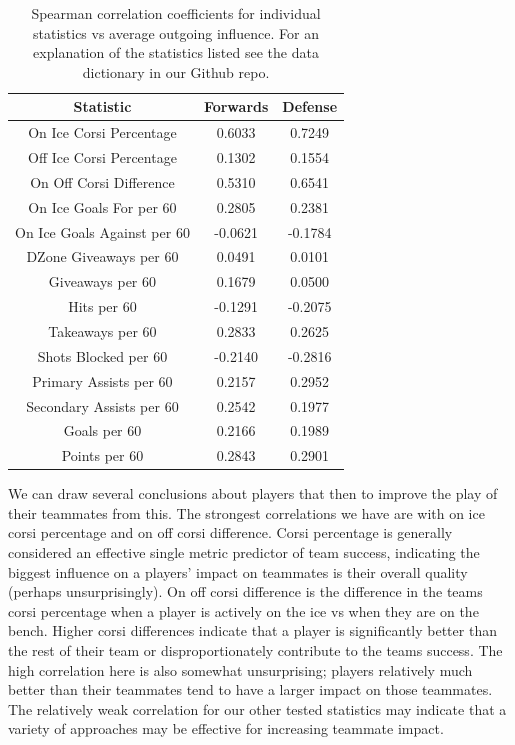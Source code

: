 \documentclass{article}
\begin{document}
\begin{table}[H]
    \centering
    \begin{tabular}{ccc}
    \hline
        Statistic & Forwards & Defense \\ \hline
        On Ice Corsi Percentage & 0.6033 & 0.7249 \\ 
        Off Ice Corsi Percentage & 0.1302& 0.1554 \\ 
        On Off Corsi Difference & 0.5310& 0.6541 \\ 
        On Ice Goals For per 60 & 0.2805& 0.2381 \\ 
        On Ice Goals Against per 60 & -0.0621&-0.1784 \\
        DZone Giveaways per 60 & 0.0491& 0.0101 \\ 
        Giveaways per 60 & 0.1679& 0.0500 \\ 
        Hits per 60 & -0.1291& -0.2075 \\ 
        Takeaways per 60 & 0.2833& 0.2625 \\ 
        Shots Blocked per 60 & -0.2140& -0.2816 \\ 
        Primary Assists per 60 & 0.2157& 0.2952 \\ 
        Secondary Assists per 60 & 0.2542& 0.1977 \\ 
        Goals per 60 & 0.2166& 0.1989 \\ 
        Points per 60 & 0.2843& 0.2901 \\ 
        \hline
    \end{tabular}
    \caption{Spearman correlation coefficients for individual statistics vs average outgoing influence. For an explanation of the statistics listed see the data dictionary in our Github repo.}
    \label{correlation}
\end{table}
We can draw several conclusions about players that then to improve the play of their teammates from this.
The strongest correlations we have are with on ice corsi percentage and on off corsi difference.
Corsi percentage is generally considered an effective single metric predictor of team success, indicating the biggest influence on a players' impact on teammates is their overall quality (perhaps unsurprisingly).
On off corsi difference is the difference in the teams corsi percentage when a player is actively on the ice vs when they are on the bench.
Higher corsi differences indicate that a player is significantly better than the rest of their team or disproportionately contribute to the teams success.
The high correlation here is also somewhat unsurprising; players relatively much better than their teammates tend to have a larger impact on those teammates.
The relatively weak correlation for our other tested statistics may indicate that a variety of approaches may be effective for increasing teammate impact.
\end{document}
